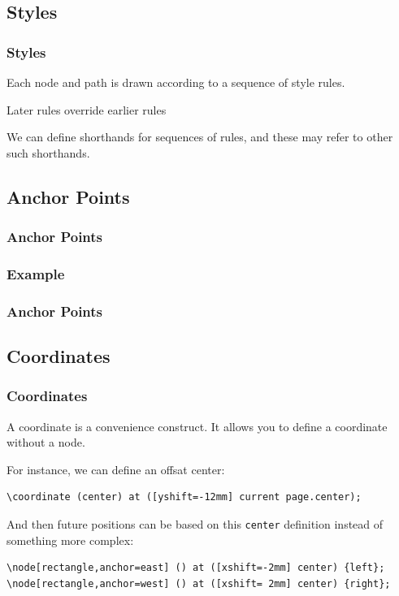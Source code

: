 \subsection{Styles}
\begin{frame}[fragile]
  \frametitle{Styles}
  \vspace{3mm}
  Each node and path is drawn according to a sequence of style rules.
  
  Later rules override earlier rules
  
  We can define shorthands for sequences of rules, and these may refer to other such shorthands.
  
\end{frame}

\subsection{Anchor Points}
\begin{frame}[fragile]
  \frametitle{Anchor Points}
  \vspace{3mm}
  
\end{frame}

\subsubsection{Example}
\begin{frame}[fragile]
  \frametitle{Anchor Points }
  \vspace{3mm}
  
\end{frame}

\subsection{Coordinates}
\begin{frame}[fragile]
  \frametitle{Coordinates}
  \vspace{3mm}
  A coordinate is a convenience construct. It allows you to define a coordinate without a node.
  
  \pause
  \vspace{5mm}
  For instance, we can define an offsat center:
  \begin{verbatim}
\coordinate (center) at ([yshift=-12mm] current page.center);
  \end{verbatim}
  
  \pause
  \vspace{5mm}
  And then future positions can be based on this \texttt{center} definition instead of something more complex:
  \begin{verbatim}
\node[rectangle,anchor=east] () at ([xshift=-2mm] center) {left};
\node[rectangle,anchor=west] () at ([xshift= 2mm] center) {right};
  \end{verbatim}
\end{frame}

